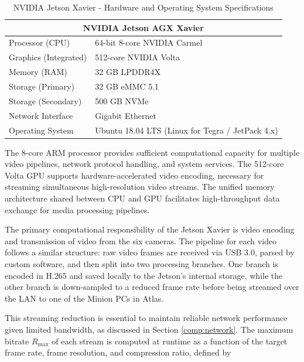 \documentclass{erauthesis}
\begin{document}
\begin{table}[htpb]
\centering
\begin{tabular}{ll}
\hline
\multicolumn{2}{c}{NVIDIA Jetson AGX Xavier} \\
\hline
\hline
Processor (CPU) & 64-bit 8-core NVIDIA Carmel \\
Graphics (Integrated) & 512-core NVIDIA Volta \\
Memory (RAM) & 32 GB LPDDR4X \\
Storage (Primary) & 32 GB eMMC 5.1 \\
Storage (Secondary) & 500 GB NVMe \\
Network Interface & Gigabit Ethernet \\
Operating System & Ubuntu 18.04 LTS (Linux for Tegra / JetPack 4.x) \\
\hline
\end{tabular}
\caption{NVIDIA Jetson Xavier - Hardware and Operating System Specifications}
\label{table:Xavier_hardware}
\end{table}

The 8-core ARM processor provides sufficient computational capacity for multiple video pipelines, network protocol handling, and system services. 
The 512-core Volta GPU supports hardware-accelerated video encoding, necessary for streaming simultaneous high-resolution video streams.
The unified memory architecture shared between CPU and GPU facilitates high-throughput data exchange for media processing pipelines.

The primary computational responsibility of the Jetson Xavier is video encoding and transmission of video from the six cameras.
The pipeline for each video follows a similar structure: raw video frames are received via USB 3.0, parsed by custom software, and then split into two processing branches. 
One branch is encoded in H.265 and saved locally to the Jetson's internal storage, while the other branch is down-sampled to a reduced frame rate before being streamed over the \ac{LAN} to one of the Minion PCs in Atlas.

This streaming reduction is essential to maintain reliable network performance given limited bandwidth, as discussed in Section \ref{comp:network}. 
The maximum bitrate $R_{\text{max}}$ of each stream is computed at runtime as a function of the target frame rate, frame resolution, and compression ratio, defined by
\end{document}

